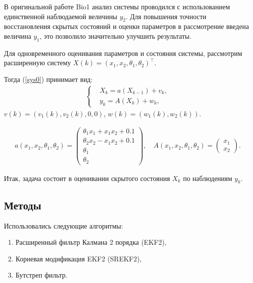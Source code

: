 \documentclass[a4paper,12pt]{article}
\begin{document}
В оригинальной работе Bio1 анализ системы проводился с использованием единственной наблюдаемой величины $y_2$. Для повышения точности восстановления скрытых состояний и оценки параметров в рассмотрение введена величина $y_1$, это позволило значительно улучшить результаты. 

Для одновременного оценивания параметров и состояния системы, рассмотрим расширенную систему $X(k) = (x_1, x_2, \theta_1, \theta_2)^\top$.

Тогда (\ref{sys0}) принимает вид:
\begin{gather}\label{sys}
    \left\{
    \begin{aligned}
        &X_k = a(X_{k-1}) + v_k,\\
        &y_k = A(X_k) + w_k,
    \end{aligned}
    \right.
\end{gather}
$v(k) = (v_1(k), v_2(k), 0, 0)$, $w(k) = (w_1(k), w_2(k))$.

\begin{gather*}
    a(x_1, x_2, \theta_1, \theta_2) = 
    \begin{pmatrix}
        \theta_1 x_1 + x_1 x_2 + 0.1\\ 
        \theta_2 x_2 - x_1 x_2 + 0.1\\
        \theta_1\\
        \theta_2
    \end{pmatrix},\quad A(x_1, x_2, \theta_1, \theta_2) = 
    \begin{pmatrix}
        x_1\\
        x_2
    \end{pmatrix}.
\end{gather*}

Итак, задача состоит в оценивании скрытого состояния $X_k$ по наблюдениям $y_k$.

\subsection{Методы}
Использовались следующие алгоритмы:
\begin{enumerate}
    \item Расширенный фильтр Калмана 2 порядка (EKF2),
    \item Корневая модификация EKF2 (SREKF2),
    \item Бутстреп фильтр.
\end{enumerate}
\end{document}
